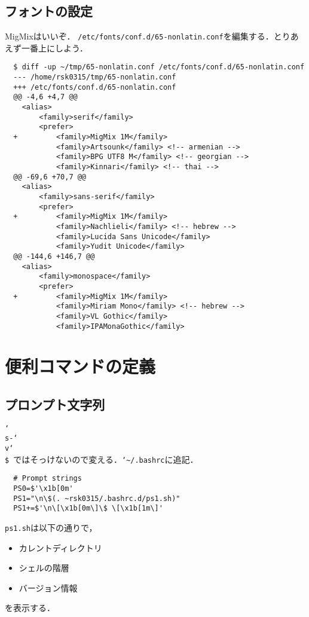 \documentclass[a4paper]{jsarticle}
\begin{document}
\subsection{フォントの設定}
MigMixはいいぞ．
\texttt{/etc/fonts/conf.d/65-nonlatin.conf}を編集する．とりあえず一番上にしよう．
\begin{lstlisting}
  $ diff -up ~/tmp/65-nonlatin.conf /etc/fonts/conf.d/65-nonlatin.conf
  --- /home/rsk0315/tmp/65-nonlatin.conf
  +++ /etc/fonts/conf.d/65-nonlatin.conf
  @@ -4,6 +4,7 @@
   	<alias>
   		<family>serif</family>
   		<prefer>
  +			<family>MigMix 1M</family>
   			<family>Artsounk</family> <!-- armenian -->
   			<family>BPG UTF8 M</family> <!-- georgian -->
   			<family>Kinnari</family> <!-- thai -->
  @@ -69,6 +70,7 @@
   	<alias>
   		<family>sans-serif</family>
   		<prefer>
  +			<family>MigMix 1M</family>
   			<family>Nachlieli</family> <!-- hebrew -->
   			<family>Lucida Sans Unicode</family>
   			<family>Yudit Unicode</family>
  @@ -144,6 +146,7 @@
   	<alias>
   		<family>monospace</family>
   		<prefer>
  +			<family>MigMix 1M</family>
   			<family>Miriam Mono</family> <!-- hebrew -->
   			<family>VL Gothic</family>
   			<family>IPAMonaGothic</family>
\end{lstlisting}

\section{便利コマンドの定義}

\subsection{プロンプト文字列}
\texttt{\char`\\{}s-\char`\\{}v\char`\\{}\$ }ではそっけないので変える．\texttt{\char`\~{}/.bashrc}に追記．
\begin{lstlisting}
  # Prompt strings
  PS0=$'\x1b[0m'
  PS1="\n\$(. ~rsk0315/.bashrc.d/ps1.sh)"
  PS1+=$'\n\[\x1b[0m\]\$ \[\x1b[1m\]'
\end{lstlisting}

\texttt{ps1.sh}は以下の通りで，
\begin{itemize}
\item カレントディレクトリ
\item シェルの階層
\item バージョン情報
\end{itemize}
を表示する．
\end{document}
